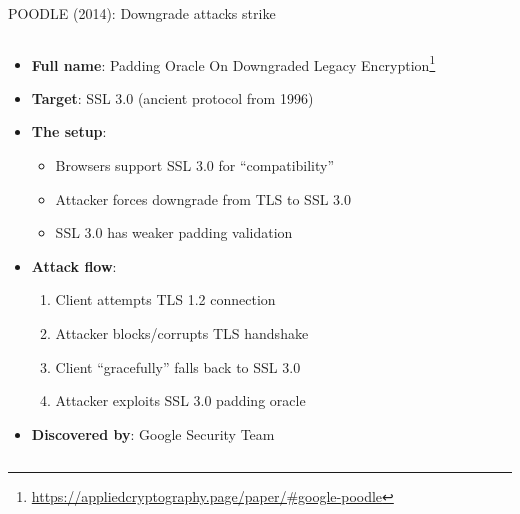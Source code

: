 \documentclass[aspectratio=169, lualatex, handout]{beamer}
\begin{document}
\begin{frame}{POODLE (2014): Downgrade attacks strike}
	\begin{columns}[c]
		\begin{column}{1\textwidth}
			\begin{itemize}
				\item \textbf{Full name}: Padding Oracle On Downgraded Legacy Encryption\footnote{\url{https://appliedcryptography.page/paper/\#google-poodle}}
				\item \textbf{Target}: SSL 3.0 (ancient protocol from 1996)
				\item \textbf{The setup}:
				      \begin{itemize}
					      \item Browsers support SSL 3.0 for ``compatibility''
					      \item Attacker forces downgrade from TLS to SSL 3.0
					      \item SSL 3.0 has weaker padding validation
				      \end{itemize}
				\item \textbf{Attack flow}:
				      \begin{enumerate}
					      \item Client attempts TLS 1.2 connection
					      \item Attacker blocks/corrupts TLS handshake
					      \item Client ``gracefully'' falls back to SSL 3.0
					      \item Attacker exploits SSL 3.0 padding oracle
				      \end{enumerate}
				\item \textbf{Discovered by}: Google Security Team
			\end{itemize}
		\end{column}
	\end{columns}
\end{frame}
\end{document}
